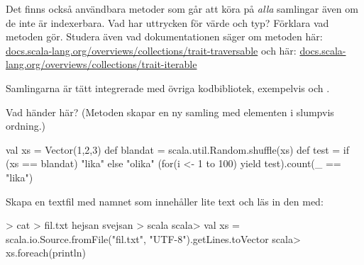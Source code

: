 \Subtask {}

\Subtask {}

\Subtask {}

\Subtask {}

\Subtask {}

\Subtask \code{}

\Subtask \code{}

\Subtask \code{}

Det finns också användbara metoder som går att köra på \emph{alla} samlingar även om de inte är indexerbara. Vad har uttrycken för värde och typ? Förklara vad metoden gör. Studera även vad dokumentationen säger om metoden här: \href{http://docs.scala-lang.org/overviews/collections/trait-traversable}{docs.scala-lang.org/overviews/collections/trait-traversable} och här: \href{http://docs.scala-lang.org/overviews/collections/trait-iterable}{docs.scala-lang.org/overviews/collections/trait-iterable}


\Subtask {}

\Subtask {}

\Subtask \code{}

\Subtask \code{}

\Subtask \code{}

\Subtask \code{}

\Subtask \code{}	

\Task Samlingarna är tätt integrerade med övriga kodbibliotek, exempelvis  och . 

\Subtask Vad händer här? (Metoden  skapar en ny samling med elementen i slumpvis ordning.)
\begin{Code}
val xs = Vector(1,2,3)
def blandat = scala.util.Random.shuffle(xs)
def test = if (xs == blandat) "lika" else "olika"
(for(i <- 1 to 100) yield test).count(_ == "lika")
\end{Code}


\Subtask Skapa en textfil med namnet  som innehåller lite text och läs in den med: \\
\begin{REPL}
> cat > fil.txt
hejsan
svejsan
> scala
scala> val xs = scala.io.Source.fromFile("fil.txt", "UTF-8").getLines.toVector
scala> xs.foreach(println)
\end{REPL}


